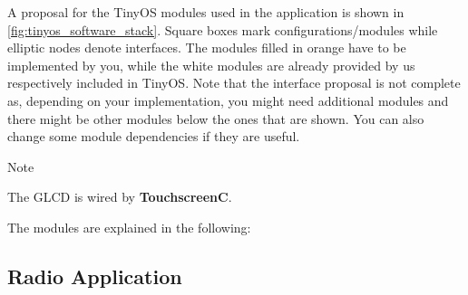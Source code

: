 \documentclass[a4paper,10pt]{article}
\newenvironment{note}[1][Note]{%
	\begin{bclogo}[noborder=true,logo=\bcinfo]{#1}
}
{\end{bclogo}}
\newcommand{\module}[1]{\textbf{#1}}
\begin{document}
A proposal for the TinyOS modules used in the application is shown in
	\cref{fig:tinyos_software_stack}.
Square boxes mark configurations/modules while elliptic nodes denote
	interfaces.
The modules filled in orange have to be implemented by you, while the white
	modules are already provided by us respectively included in TinyOS.
Note that the interface proposal is not complete as, depending on your
	implementation, you might need additional modules and there might be other
	modules below the ones that are shown.
You can also change some module dependencies if they are useful.

\begin{note}
	The GLCD is wired by \module{TouchscreenC}.
\end{note}

The modules are explained in the following:

\subsection{Radio Application}
\end{document}
